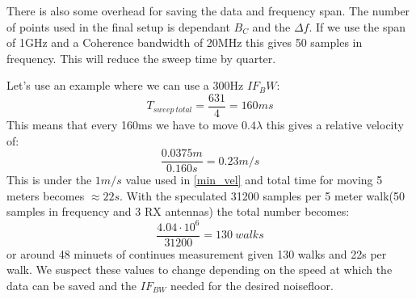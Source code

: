 There is also some overhead for saving the data and frequency span. The number of points used in the final setup is dependant $B_C$ and the $\Delta f$. If we use the span of 1GHz and a Coherence bandwidth of 20MHz this gives 50 samples in frequency.  This will reduce the sweep time by quarter.

Let's  use an example where we can use a 300Hz $IF_BW$:
\begin{equation}
T_{sweep \ total} = \frac{631}{4} = 160ms
\end{equation}
This means that every 160ms we have to move $0.4 \lambda$ this gives a relative velocity of:
\begin{equation}
\frac{0.0375m}{0.160s} = 0.23 m/s
\end{equation}
This is under the $1m/s$ value used in \autoref{min_vel}
and total time for moving 5 meters becomes $\approx 22s$.
With the speculated 31200 samples per 5 meter walk(50 samples in frequency and 3 RX antennas) the total number becomes:
\begin{equation}
\frac{4.04 \cdot 10^6}{31200} = 130 \ walks
\end{equation}
or around 48 minuets of continues measurement given 130 walks and 22s per walk. We suspect these values to change depending on the speed at which the data can be saved and the $IF_{BW}$ needed for the desired noisefloor.
